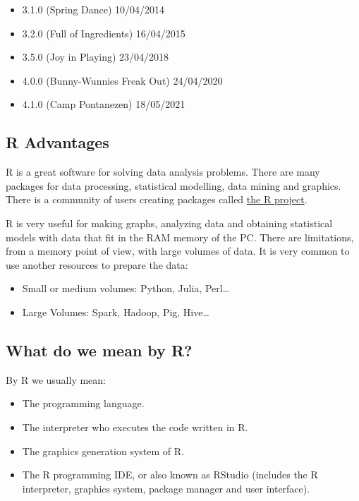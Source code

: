 \documentclass[
]{book}
\providecommand{\tightlist}{%
  \setlength{\itemsep}{0pt}\setlength{\parskip}{0pt}}
\begin{document}
\begin{itemize}
\tightlist
\item
  3.1.0 (Spring Dance) 10/04/2014
\item
  3.2.0 (Full of Ingredients) 16/04/2015
\item
  3.5.0 (Joy in Playing) 23/04/2018
\item
  4.0.0 (Bunny-Wunnies Freak Out) 24/04/2020
\item
  4.1.0 (Camp Pontanezen) 18/05/2021
\end{itemize}

\hypertarget{r-advantages}{%
\subsection{R Advantages}\label{r-advantages}}

R is a great software for solving data analysis problems. There are many packages for data processing, statistical modelling, data mining and graphics. There is a community of users creating packages called \href{https://www.r-project.org}{the R project}.

R is very useful for making graphs, analyzing data and obtaining statistical models with data that fit in the RAM memory of the PC. There are limitations, from a memory point of view, with large volumes of data. It is very common to use another resources to prepare the data:

\begin{itemize}
\tightlist
\item
  Small or medium volumes: Python, Julia, Perl\ldots{}
\item
  Large Volumes: Spark, Hadoop, Pig, Hive\ldots{}
\end{itemize}

\hypertarget{what-do-we-mean-by-r}{%
\subsection{What do we mean by R?}\label{what-do-we-mean-by-r}}

By R we usually mean:

\begin{itemize}
\tightlist
\item
  The programming language.
\item
  The interpreter who executes the code written in R.
\item
  The graphics generation system of R.
\item
  The R programming IDE, or also known as RStudio (includes the R interpreter, graphics system, package manager and user interface).
\end{itemize}
\end{document}

